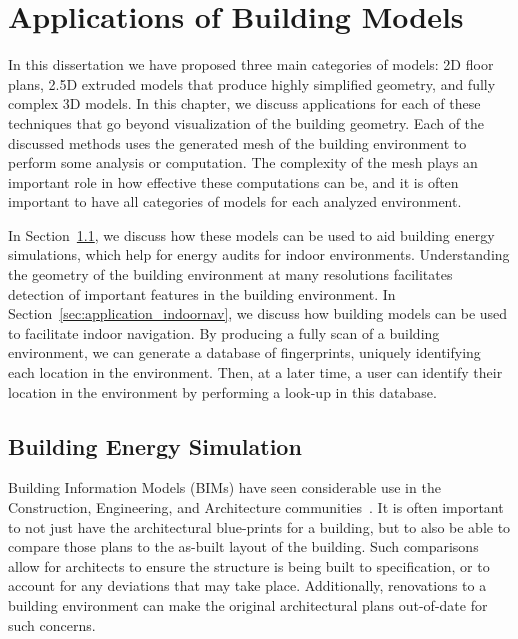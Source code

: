 \documentclass[12pt,onecolumn,oneside]{book}
\begin{document}
\chapter{Applications of Building Models}
\label{ch:applications}

In this dissertation we have proposed three main categories of models:  2D floor plans, 2.5D extruded models that produce highly simplified geometry, and fully complex 3D models.  In this chapter, we discuss applications for each of these techniques that go beyond visualization of the building geometry.  Each of the discussed methods uses the generated mesh of the building environment to perform some analysis or computation.  The complexity of the mesh plays an important role in how effective these computations can be, and it is often important to have all categories of models for each analyzed environment.

In Section~\ref{sec:application_energyplus}, we discuss how these models can be used to aid building energy simulations, which help for energy audits for indoor environments.  Understanding the geometry of the building environment at many resolutions facilitates detection of important features in the building environment.  In Section~\ref{sec:application_indoornav}, we discuss how building models can be used to facilitate indoor navigation.  By producing a fully scan of a building environment, we can generate a database of fingerprints, uniquely identifying each location in the environment.  Then, at a later time, a user can identify their location in the environment by performing a look-up in this database.

\section{Building Energy Simulation}
\label{sec:application_energyplus}

Building Information Models (BIMs) have seen considerable use in the Construction, Engineering, and Architecture communities~\cite{AutodeskBIM}.  It is often important to not just have the architectural blue-prints for a building, but to also be able to compare those plans to the as-built layout of the building.  Such comparisons allow for architects to ensure the structure is being built to specification, or to account for any deviations that may take place.  Additionally, renovations to a building environment can make the original architectural plans out-of-date for such concerns.
\end{document}
